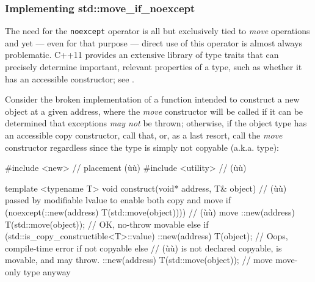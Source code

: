 \subsubsection[Implementing \lstinline!std::move_if_noexcept!]{Implementing {\SubsubsecCode std::move\_if\_noexcept}}\label{implementing-std::move_if_noexcept}

The need for the \lstinline!noexcept! operator is all but exclusively tied
to \emph{move} operations and yet --- even for that purpose --- direct
use of this operator is almost always problematic. C++11 provides an
extensive library of type traits that can precisely determine important,
relevant properties of a type, such as whether it has an accessible
constructor; see .

Consider the broken implementation of a function intended to construct a
new object at a given address, where the \emph{move} constructor will be
called if it can be determined that exceptions \emph{may not} be thrown;
otherwise, if the object type has an accessible copy constructor, call
that, or, as a last resort, call the \emph{move} constructor regardless
since the type is simply not copyable (a.k.a.  type):

\begin{emcppshiddenlisting}[emcppsbatch={e18,e19,e20}]
#include <new>      // placement (ù{}ù)
#include <utility>  // (ù{}ù)
\end{emcppshiddenlisting}
\begin{emcppslisting}[emcppsbatch=e18]
template <typename T>
void construct(void* address, T& object)
     // (ù{}ù) passed by modifiable lvalue to enable both copy and move
{
    if (noexcept(::new(address) T(std::move(object))))  // (ù{}ù) move
    {
        ::new(address) T(std::move(object));   // OK, no-throw movable
    }
    else if (std::is_copy_constructible<T>::value)
    {
        ::new(address) T(object);  // Oops, compile-time error if not copyable
    }
    else // (ù{}ù) is not declared copyable, is movable, and may throw.
    {
        ::new(address) T(std::move(object));  // move move-only type anyway
    }
}
\end{emcppslisting}
    

